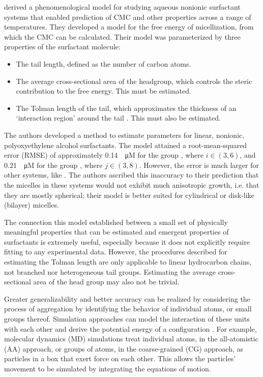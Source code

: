 \citet{puvvadaMolecularThermodynamicApproach1990} derived a phenomenological
model for studying aqueous nonionic surfactant systems that enabled prediction
of CMC and other properties across a range of temperatures. They developed a
model for the free energy of micellization, from which the CMC can be
calculated. Their model was parameterized by three properties of the surfactant
molecule:
\begin{itemize}
    \item The tail length, defined as the number of carbon atoms.
    \item The average cross-sectional area of the headgroup, which controls the
          steric contribution to the free energy. This must be estimated.
    \item The Tolman length of the tail, which approximates the thickness of an
          `interaction region' around the tail
          \cite{demiguelGibbsThermodynamicsSurface2021}. This must also be
          estimated.
\end{itemize}

The authors developed a method to estimate parameters for linear, nonionic,
polyoxyethylene alcohol surfactants. The model attained a root-mean-squared
error (RMSE) of approximately \SI{0.14}{\log \micro M} for the group
, where $i \in (3, 6)$, and \SI{0.21}{\log \micro M} for the group
, where $j \in (3, 8)$. However, the error is much larger for other
systems, like . The authors ascribed this inaccuracy to their
prediction that the micelles in these systems would not exhibit much anisotropic
growth, i.e. that they are mostly spherical; their model is better suited for
cylindrical or disk-like (bilayer) micelles.

The connection this model established between a small set of physically meaningful properties that can be estimated and emergent properties of surfactants is extremely useful, especially because it does not explicitly require fitting to any experimental data. However, the procedures described for estimating the Tolman length are only applicable to linear hydrocarbon chains, not branched nor heterogeneous tail groups. Estimating the average cross-sectional area of the head group may also not be trivial.

Greater generalizability and better accuracy can be realized by considering the
process of aggregation by identifying the behavior of individual atoms, or
small groups thereof. Simulation approaches can model the interaction of these
units with each other and derive the potential energy of a configuration
\cite{frenkelUnderstandingMolecularSimulation2001,joshiReviewAdvancementsCoarsegrained2021,filipeMolecularDynamicsSimulations2022}.
For example, molecular dynamics (MD) simulations treat individual atoms, in the
all-atomistic (AA) approach, or groups of atoms, in the coarse-grained (CG)
approach, as particles in a box that exert force on each other. This allows the
particles' movement to be simulated by integrating the equations of motion.

